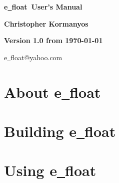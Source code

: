 \documentclass[a4paper,12pt]{scrartcl} %
\def\efloat          {e{\ttfamily\underline\ }float}
\def\efloathyperref     {\texorpdfstring{\efloat}{e\_float}}
\begin{document}

\begin{center}

{\Huge\bf\sf \efloat\ User's Manual}

\vspace{2cm}

{\Large\bf\sf Christopher Kormanyos}%
\vspace{2cm}

{\Large\bf\sf Version 1.0 from \today} %

\vspace{\fill}

e\underline\ float@yahoo.com

\end{center}

\newpage


\pagestyle{cb} %

\tableofcontents

\newpage

\section   {About \efloathyperref}                   \label{sec:about}
                                                     

\pagebreak

\section   {Building \efloathyperref}                \label{sec:build}
                                                     

\pagebreak

\section   {Using \efloathyperref}                   \label{sec:using}
                                                     
\end{document}
